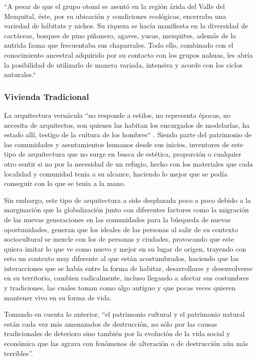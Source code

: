``A pesar de que el grupo otomí se asentó en la región árida del Valle del Mezquital, éste, por su ubicación y condiciones ecológicas, encerraba una variedad de hábitats y nichos. Su riqueza se hacía manifiesta en la diversidad de cactáceas, bosques de pino piñonero, agaves, yucas, mezquites, además de la nutrida fauna que frecuentaba sus chaparrales. Todo ello, combinado con el conocimiento ancestral adquirido por su contacto con los grupos nahuas, les abría la posibilidad de utilizarlo de manera variada, intensiva y acorde con los ciclos naturales.`` \citep{granados2004agricultura}

\subsubsection{Vivienda Tradicional}
La arquitectura vernácula ``no responde a estilos, no representa épocas, no necesita de arquitectos, son quienes las habitan los encargados de modelarlas, ha estado allí, testigo de la cultura de los hombres`` \citep{gonzalez2017arquitectura}. Siendo parte del patrimonio de las comunidades y asentamientos humanos desde sus inicios, inventores de este tipo de arquitectura que no surge en busca de estética, proporción o cualquier otro sentir si no por la necesidad de un refugio, hecho con los materiales que cada localidad y comunidad tenia a su alcance, haciendo lo mejor que se podía conseguir con lo que se tenia a la mano.

Sin embargo, este tipo de arquitectura a sido desplazada poco a poco debido a la marginación que la globalización junto con diferentes factores como la migración de las nuevas generaciones en las comunidades para la búsqueda de nuevas oportunidades, generan que los ideales de las personas al salir de su contexto sociocultural se mezcle con los de personas y ciudades, provocando que este quiera imitar lo que ve como nuevo y mejor en su lugar de origen, trayendo con esto un contexto muy diferente al que están acostumbrados, haciendo que las interacciones que se había entre la forma de habitar, desarrollarse y desenvolverse en su territorio, cambien radicalmente, incluso llegando a afectar sus costumbres y tradiciones, las cuales toman como algo antiguo y que pocas veces quieren mantener vivo en su forma de vida. 

Tomando en cuenta lo anterior, ``el patrimonio cultural y el patrimonio natural están cada vez más amenazados de destrucción, no sólo por las causas tradicionales de deterioro sino también por la evolución de la vida social y económica que las agrava con fenómenos de alteración o de destrucción aún más terribles''\citep{UNESCO1972}.

